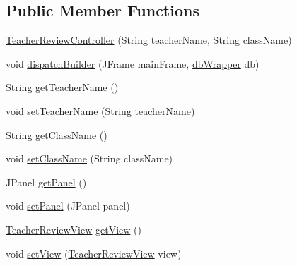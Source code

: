 \subsection*{Public Member Functions}
\begin{DoxyCompactItemize}
\item 
\mbox{\hyperlink{classcom_1_1_b_n_u_1_1pages_1_1teacher__review_1_1_teacher_review_controller_a97694fc4390e4d092b746706e14cd1a3}{Teacher\+Review\+Controller}} (String teacher\+Name, String class\+Name)
\item 
void \mbox{\hyperlink{classcom_1_1_b_n_u_1_1pages_1_1teacher__review_1_1_teacher_review_controller_ada43c177bf2ecfe230401bad1b00c2d9}{dispatch\+Builder}} (J\+Frame main\+Frame, \mbox{\hyperlink{interfacecom_1_1_b_n_u_1_1database_1_1db_wrapper}{db\+Wrapper}} db)
\item 
String \mbox{\hyperlink{classcom_1_1_b_n_u_1_1pages_1_1teacher__review_1_1_teacher_review_controller_a60df0c10309695f21ce4a6fa6c5cce59}{get\+Teacher\+Name}} ()
\item 
void \mbox{\hyperlink{classcom_1_1_b_n_u_1_1pages_1_1teacher__review_1_1_teacher_review_controller_a5580fa6aced95169b23dc42f3c49fd99}{set\+Teacher\+Name}} (String teacher\+Name)
\item 
String \mbox{\hyperlink{classcom_1_1_b_n_u_1_1pages_1_1teacher__review_1_1_teacher_review_controller_aa71180538df5e5c5027b372692d2d79e}{get\+Class\+Name}} ()
\item 
void \mbox{\hyperlink{classcom_1_1_b_n_u_1_1pages_1_1teacher__review_1_1_teacher_review_controller_af90ccea2e87cec6ec5d61b04a3fc19b0}{set\+Class\+Name}} (String class\+Name)
\item 
J\+Panel \mbox{\hyperlink{classcom_1_1_b_n_u_1_1pages_1_1teacher__review_1_1_teacher_review_controller_a06a186360b94b56849abbeaa2e7f43ff}{get\+Panel}} ()
\item 
void \mbox{\hyperlink{classcom_1_1_b_n_u_1_1pages_1_1teacher__review_1_1_teacher_review_controller_aee2e747f5fb4df52966afea1afee7a08}{set\+Panel}} (J\+Panel panel)
\item 
\mbox{\hyperlink{classcom_1_1_b_n_u_1_1pages_1_1teacher__review_1_1_teacher_review_view}{Teacher\+Review\+View}} \mbox{\hyperlink{classcom_1_1_b_n_u_1_1pages_1_1teacher__review_1_1_teacher_review_controller_a9147a390d46acc6078a707b6c215fbcb}{get\+View}} ()
\item 
void \mbox{\hyperlink{classcom_1_1_b_n_u_1_1pages_1_1teacher__review_1_1_teacher_review_controller_ab46e4af5c31a141a06847cc9bbf0933a}{set\+View}} (\mbox{\hyperlink{classcom_1_1_b_n_u_1_1pages_1_1teacher__review_1_1_teacher_review_view}{Teacher\+Review\+View}} view)

\end{DoxyCompactItemize}
